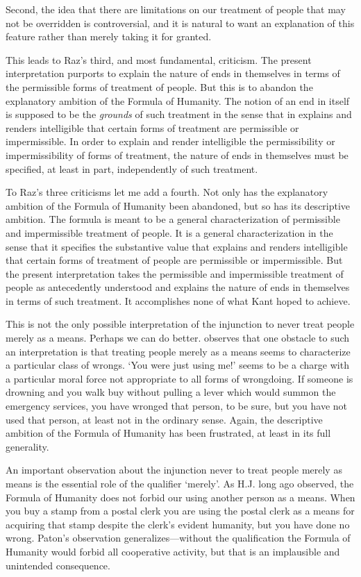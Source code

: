 \documentclass[12pt]{article}
\begin{document}
Second, the idea that there are limitations on our treatment of people that may not be overridden is controversial, and it is natural to want an explanation of this feature rather than merely taking it for granted.

This leads to Raz's third, and most fundamental, criticism. The present interpretation purports to explain the nature of ends in themselves in terms of the permissible forms of treatment of people. But this is to abandon the explanatory ambition of the Formula of Humanity. The notion of an end in itself is supposed to be the \emph{grounds} of such treatment in the sense that in explains and renders intelligible that certain forms of treatment are permissible or impermissible. In order to explain and render intelligible the permissibility or impermissibility of forms of treatment, the nature of ends in themselves must be specified, at least in part, independently of such treatment.

To Raz's three criticisms let me add a fourth. Not only has the explanatory ambition of the Formula of Humanity been abandoned, but so has its descriptive ambition. The formula is meant to be a general characterization of permissible and impermissible treatment of people. It is a general characterization in the sense that it specifies the substantive value that explains and renders intelligible that certain forms of treatment of people are permissible or impermissible. But the present interpretation takes the permissible and impermissible treatment of people as antecedently understood and explains the nature of ends in themselves in terms of such treatment. It accomplishes none of what Kant hoped to achieve.

This is not the only possible interpretation of the injunction to never treat people merely as a means. Perhaps we can do better. \cite{Scanlon:2004ac} observes that one obstacle to such an interpretation is that treating people merely as a means seems to characterize a particular class of wrongs. `You were just using me!' seems to be a charge with a particular moral force not appropriate to all forms of wrongdoing. If someone is drowning and you walk buy without pulling a lever which would summon the emergency services, you have wronged that person, to be sure, but you have not used that person, at least not in the ordinary sense. Again, the descriptive ambition of the Formula of Humanity has been frustrated, at least in its full generality. 

An important observation about the injunction never to treat people merely as means is the essential role of the qualifier `merely'. As H.J. \citet{Paton:1946dz} long ago observed, the Formula of Humanity does not forbid our using another person as a means. When you buy a stamp from a postal clerk you are using the postal clerk as a means for acquiring that stamp despite the clerk's evident humanity, but you have done no wrong. Paton's observation generalizes---without the qualification the Formula of Humanity would forbid all cooperative activity, but that is an implausible and unintended consequence.
\end{document}
